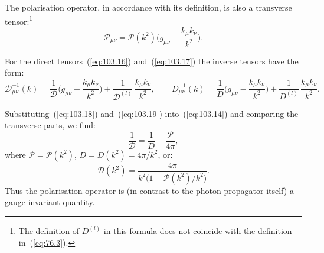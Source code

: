 
The polarisation operator, in accordance with its definition, is also a transverse tensor:\footnote{The definition of $D^{(l)}$ in this formula does not coincide with the definition in~(\ref{eq:76.3}).}
\begin{equation}
\mathcal{P}_{\mu\nu} = \mathcal{P}(k^2)\biggl(g_{\mu\nu} - \frac{k_\mu k_\nu}{k^2}\biggr).
\label{eq:103.18}
\end{equation}

For the direct tensors~(\ref{eq:103.16}) and~(\ref{eq:103.17}) the inverse tensors have the form:
\begin{equation}
\mathcal{D}^{-1}_{\mu\nu}(k) = \frac{1}{\mathcal{D}}\biggl(g_{\mu\nu} - \frac{k_\mu k_\nu}{k^2}\biggr) + \frac{1}{\mathcal{D}^{(l)}}\,\frac{k_\mu k_\nu}{k^2},\qquad
D^{-1}_{\mu\nu}(k) = \frac{1}{D}\biggl(g_{\mu\nu} - \frac{k_\mu k_\nu}{k^2}\biggr) + \frac{1}{D^{(l)}}\,\frac{k_\mu k_\nu}{k^2}.
\label{eq:103.19}
\end{equation}

Substituting~(\ref{eq:103.18}) and~(\ref{eq:103.19}) into~(\ref{eq:103.14}) and comparing the transverse parts, we find:
\begin{equation}
\frac{1}{\mathcal{D}} = \frac{1}{D} - \frac{\mathcal{P}}{4\pi},
\label{eq:103.20}
\end{equation}
where $\mathcal{P} = \mathcal{P}(k^2)$, $D = D(k^2) = 4\pi/k^2$, or:
\begin{equation}
\mathcal{D}(k^2) = \frac{4\pi}{k^2\bigl(1 - \mathcal{P}(k^2)/k^2\bigr)}.
\label{eq:103.21}
\end{equation}
Thus the polarisation operator is (in contrast to the photon propagator itself) a gauge-invariant quantity.
